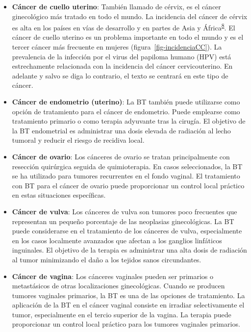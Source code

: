 \documentclass[
  a4paper,
]{scrreprt}
\begin{document}
\begin{itemize}
\item
  \textbf{Cáncer de cuello uterino}: También llamado de cérvix, es el
  cáncer ginecológico más tratado en todo el mundo. La incidencia del
  cáncer de cérvix es alta en los países en vías de desarrollo y en
  partes de Asia y
  África\textsuperscript{\protect\hyperlink{ref-jemal2008}{8}}. El
  cáncer de cuello uterino es un problema importante en todo el mundo y
  es el tercer cáncer más frecuente en mujeres
  (figura~\ref{fig-incidenciaCC}). La prevalencia de la infección por el
  virus del papiloma humano (HPV) está estrechamente relacionada con la
  incidencia del cáncer cervicouterino. En adelante y salvo se diga lo
  contrario, el texto se centrará en este tipo de cáncer.
\item
  \textbf{Cáncer de endometrio (uterino)}: La BT también puede
  utilizarse como opción de tratamiento para el cáncer de endometrio.
  Puede emplearse como tratamiento primario o como terapia adyuvante
  tras la cirugía. El objetivo de la BT endometrial es administrar una
  dosis elevada de radiación al lecho tumoral y reducir el riesgo de
  recidiva local.
\item
  \textbf{Cáncer de ovario}: Los cánceres de ovario se tratan
  principalmente con resección quirúrgica seguida de quimioterapia. En
  casos seleccionados, la BT se ha utilizado para tumores recurrentes en
  el fondo vaginal. El tratamiento con BT para el cáncer de ovario puede
  proporcionar un control local práctico en estas situaciones
  específicas.
\item
  \textbf{Cáncer de vulva}: Los cánceres de vulva son tumores poco
  frecuentes que representan un pequeño porcentaje de las neoplasias
  ginecológicas. La BT puede considerarse en el tratamiento de los
  cánceres de vulva, especialmente en los casos localmente avanzados que
  afectan a los ganglios linfáticos inguinales. El objetivo de la
  terapia es administrar una alta dosis de radiación al tumor
  minimizando el daño a los tejidos sanos circundantes.
\item
  \textbf{Cáncer de vagina}: Los cánceres vaginales pueden ser primarios
  o metastásicos de otras localizaciones ginecológicas. Cuando se
  producen tumores vaginales primarios, la BT es una de las opciones de
  tratamiento. La aplicación de la BT en el cáncer vaginal consiste en
  irradiar selectivamente el tumor, especialmente en el tercio superior
  de la vagina. La terapia puede proporcionar un control local práctico
  para los tumores vaginales primarios.
\end{itemize}
\end{document}
